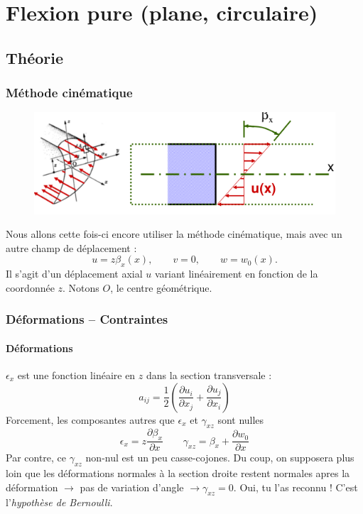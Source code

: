 \chapter{Flexion pure (plane, circulaire)}
\section{Théorie}
	\subsection{Méthode cinématique}
	\begin{figure}
	\vspace{-7mm}
	\includegraphics[scale=0.4]{ch4/image1.png}
	\end{figure}
	Nous allons cette fois-ci encore utiliser la méthode cinématique, mais 
	avec un autre champ de déplacement :
	\begin{equation}
	u=z\beta_x(x),\qquad v=0,\qquad w=w_0(x).
	\end{equation}
	Il s'agit d'un déplacement axial $u$ variant linéairement en fonction 
	de la coordonnée $z$. Notons $O$, le centre géométrique.
	
	\subsection{Déformations – Contraintes}
		\subsubsection{Déformations}
		$\epsilon_x$ est une fonction linéaire en $z$ dans la section 
		transversale :
		\begin{equation}
		a_{ij} =  \frac{1}{2}\left(\dfrac{\partial u_i}{\partial x_j}+\dfrac{
		\partial u_j}{\partial x_i}\right)
		\end{equation}
		Forcement, les composantes autres que $\epsilon_x$ et $\gamma_{xz}$ 
		sont nulles
		\begin{equation}
		\epsilon_x = z\dfrac{\partial \beta_x}{\partial x}\qquad \gamma_{xz} = 
		\beta_x + \dfrac{\partial w_0}{\partial x}
		\end{equation}
		Par contre, ce $\gamma_{xz}$ non-nul est un peu casse-cojones. Du coup, 
		on supposera plus loin que les déformations normales à la section 
		droite restent normales apres la déformation $\rightarrow$ pas de 
		variation d'angle $\rightarrow \gamma_{xz} = 0$. Oui, tu l'as reconnu ! 
		C'est l'\textit{hypothèse de Bernoulli}.
		
